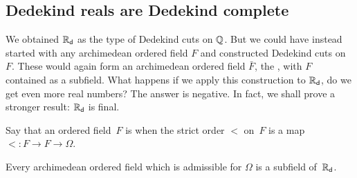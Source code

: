 \subsection{Dedekind reals are Dedekind complete}
\label{sec:RD-dedekind-complete}

We obtained $\mathbb{R}_\mathsf{d}$ as the type of Dedekind cuts on $\mathbb{Q}$. But we could have instead started
with any archimedean ordered field $F$ and constructed Dedekind cuts on $F$. These would
again form an archimedean ordered field $\bar{F}$, the ,%
%
with $F$ contained as a subfield. What happens if we apply this construction to
$\mathbb{R}_\mathsf{d}$, do we get even more real numbers? The answer is negative. In fact, we shall prove a
stronger result: $\mathbb{R}_\mathsf{d}$ is final.

Say that an ordered field~$F$ is 
%
%
when the strict order
$<$ on~$F$ is a map ${<} : F \to F \to \Omega$.

\begin{thm} \label{RD-final-field}
  Every archimedean ordered field which is admissible for $\Omega$ is a subfield of~$\mathbb{R}_\mathsf{d}$.
\end{thm}

